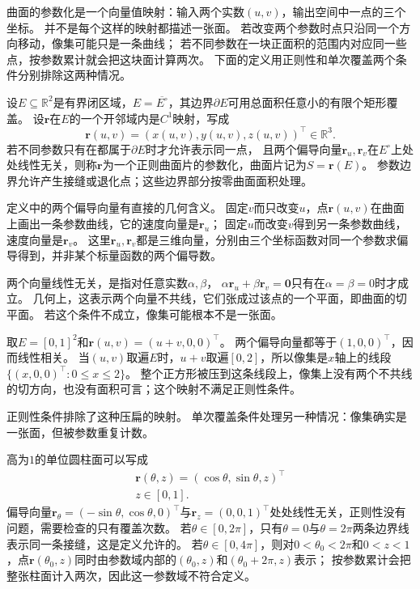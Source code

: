 曲面的参数化是一个向量值映射：输入两个实数$(u,v)$，输出空间中一点的三个坐标。
并不是每个这样的映射都描述一张面。
若改变两个参数时点只沿同一个方向移动，像集可能只是一条曲线；
若不同参数在一块正面积的范围内对应同一些点，按参数累计就会把这块面计算两次。
下面的定义用正则性和单次覆盖两个条件分别排除这两种情况。

\begin{definition}[正则参数曲面片]
\label{def:analysis-regular-surface-patch}
设$E\subseteq\mathbb R^2$是有界闭区域，$E=\overline{E^\circ}$，其边界$\partial E$可用总面积任意小的有限个矩形覆盖。
设$\bm r$在$E$的一个开邻域内是$C^1$映射，写成
\[
 \bm r(u,v)=(x(u,v),y(u,v),z(u,v))^\top\in\mathbb R^3.
\]
若不同参数只有在都属于$\partial E$时才允许表示同一点，
且两个偏导向量$\bm r_u,\bm r_v$在$E^\circ$上处处线性无关，则称$\bm r$为一个正则曲面片的参数化，曲面片记为$S=\bm r(E)$。
参数边界允许产生接缝或退化点；这些边界部分按零曲面面积处理。
\end{definition}

定义中的两个偏导向量有直接的几何含义。
固定$v$而只改变$u$，点$\bm r(u,v)$在曲面上画出一条参数曲线，它的速度向量是$\bm r_u$；
固定$u$而改变$v$得到另一条参数曲线，速度向量是$\bm r_v$。
这里$\bm r_u,\bm r_v$都是三维向量，分别由三个坐标函数对同一个参数求偏导得到，并非某个标量函数的两个偏导数。

两个向量线性无关，是指对任意实数$\alpha,\beta$，
$\alpha\bm r_u+\beta\bm r_v=\bm0$只有在$\alpha=\beta=0$时才成立。
几何上，这表示两个向量不共线，它们张成过该点的一个平面，即曲面的切平面。
若这个条件不成立，像集可能根本不是一张面。

\begin{example}[像集退化为线段的参数映射]
取$E=[0,1]^2$和$\bm r(u,v)=(u+v,0,0)^\top$。
两个偏导向量都等于$(1,0,0)^\top$，因而线性相关。
当$(u,v)$取遍$E$时，$u+v$取遍$[0,2]$，所以像集是$x$轴上的线段$\{(x,0,0)^\top:0\leq x\leq2\}$。
整个正方形被压到这条线段上，像集上没有两个不共线的切方向，也没有面积可言；这个映射不满足正则性条件。
\end{example}

正则性条件排除了这种压扁的映射。
单次覆盖条件处理另一种情况：像集确实是一张面，但被参数重复计数。

\begin{example}[圆柱面的单次覆盖与二重覆盖]
\label{ex:analysis-cylinder-double-cover}
高为$1$的单位圆柱面可以写成
\[
\begin{gathered}
\bm r(\theta,z)=(\cos\theta,\sin\theta,z)^\top\\
z\in[0,1].
\end{gathered}
\]
偏导向量$\bm r_\theta=(-\sin\theta,\cos\theta,0)^\top$与$\bm r_z=(0,0,1)^\top$处处线性无关，正则性没有问题，需要检查的只有覆盖次数。
若$\theta\in[0,2\pi]$，只有$\theta=0$与$\theta=2\pi$两条边界线表示同一条接缝，这是定义允许的。
若$\theta\in[0,4\pi]$，则对$0<\theta_0<2\pi$和$0<z<1$，点$\bm r(\theta_0,z)$同时由参数域内部的$(\theta_0,z)$和$(\theta_0+2\pi,z)$表示；
按参数累计会把整张柱面计入两次，因此这一参数域不符合定义。
\end{example}

